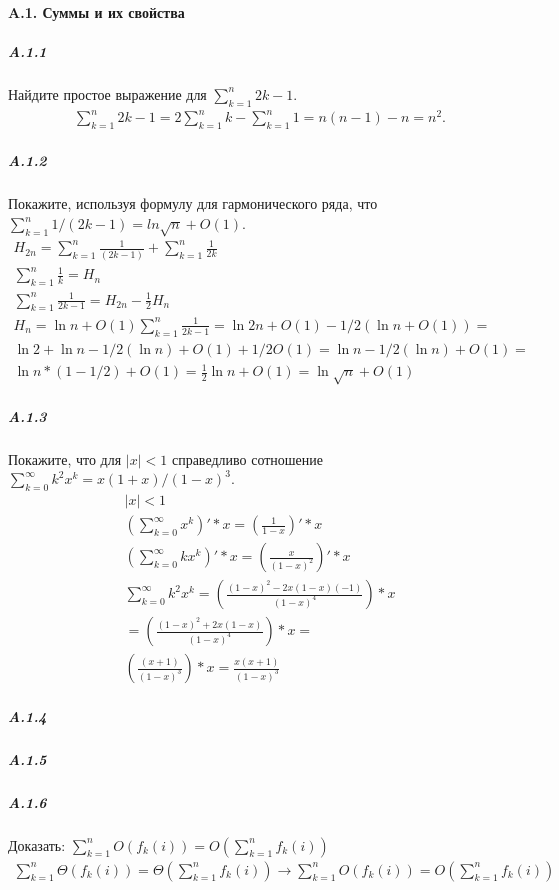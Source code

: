 \paragraph{A.1. Суммы и их свойства}
\subparagraph{A.1.1}
Найдите простое выражение для $\sum_{k=1}^n {2k-1}$.
\begin{gather*}
\sum_{k=1}^n {2k-1} = 2\sum_{k=1}^n {k} - \sum_{k=1}^n {1} = n(n-1) - n = n^2.
\end{gather*}

\subparagraph{A.1.2}
Покажите, используя формулу для гармонического ряда, что $\sum_{k=1}^n {1/(2k-1)} = ln{\sqrt{n}} + O(1)$.
\begin{gather*}
H_{2n} = \sum_{k=1}^n {\frac{1}{(2k-1)}} + \sum_{k=1}^{n} {\frac{1}{2k}} \\
\sum_{k=1}^{n} {\frac{1}{k}} = H_n \\ 
\sum_{k=1}^{n} {\frac{1}{2k-1}} = H_{2n} - \frac{1}{2}H_n \\
H_n = \ln{n} + O(1)
\sum_{k=1}^{n} {\frac{1}{2k-1}} = \ln{2n} + O(1) - 1/2(\ln{n} + O(1)) = \\
\ln{2} + \ln{n} - 1/2(\ln{n}) + O(1) + 1/2O(1) = \ln{n} - 1/2(\ln{n}) + O(1) = \\ 
\ln{n}*(1 - 1/2) + O(1) = \frac{1}{2}\ln{n} + O(1) = \ln{\sqrt{n}} + O(1)
\end{gather*}

\subparagraph{A.1.3}
Покажите, что для $\left\lvert{x}\right\rvert < 1$ справедливо сотношение $\sum_{k=0}^{\infty} {k^2x^k} = x(1+x)/(1-x)^3$.
\begin{gather*}
\left\lvert{x}\right\rvert < 1 \\
\left(\sum_{k=0}^{\infty} {x^k}\right)' * x = \left( \frac{1}{1-x}\right)' * x \\
\left(\sum_{k=0}^{\infty} {kx^k}\right)' * x = \left( \frac{x}{(1-x)^2}\right)' * x \\
\sum_{k=0}^{\infty} {k^2x^k} = \left( \frac{(1-x)^2 - 2x(1 - x)(-1)}{(1-x)^4}\right) * x \\
= \left( \frac{(1-x)^2 + 2x(1 - x)}{(1-x)^4}\right) * x = \\
\left( \frac{(x+1)}{(1-x)^3}\right) * x = \frac{x(x+1)}{(1-x)^3}
\end{gather*}

\subparagraph{A.1.4}

\subparagraph{A.1.5}

\subparagraph{A.1.6}
Доказать: $\sum_{k=1}^{n}{O(f_k(i))} = O(\sum_{k=1}^{n}{f_k(i)})$
\begin{gather*}
\sum_{k=1}^{n}{\Theta(f_k(i))} = \Theta(\sum_{k=1}^{n}{f_k(i)})
\to 
\sum_{k=1}^{n}{O(f_k(i))} = O(\sum_{k=1}^{n}{f_k(i)})
\end{gather*}

